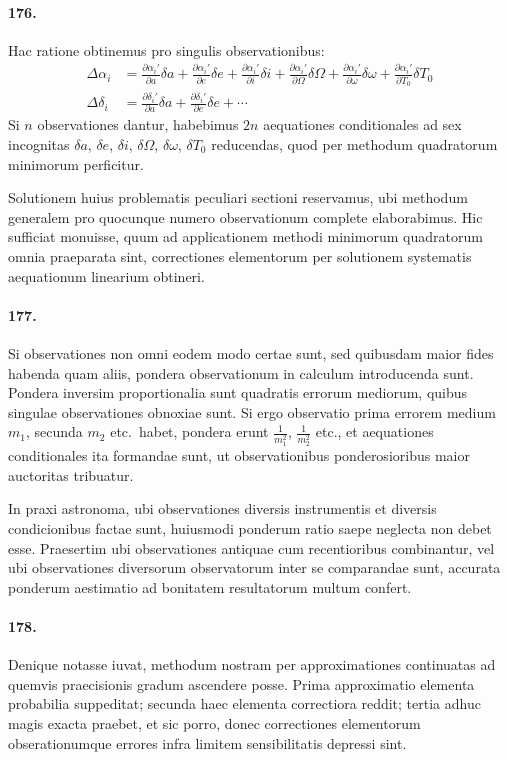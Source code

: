 \documentclass[12pt,a4paper]{article}
\begin{document}
\paragraph{176.}
Hac ratione obtinemus pro singulis observationibus:
\begin{align*}
\Delta\alpha_i &= \frac{\partial\alpha_i'}{\partial a}\delta a + \frac{\partial\alpha_i'}{\partial e}\delta e + \frac{\partial\alpha_i'}{\partial i}\delta i + \frac{\partial\alpha_i'}{\partial\Omega}\delta\Omega + \frac{\partial\alpha_i'}{\partial\omega}\delta\omega + \frac{\partial\alpha_i'}{\partial T_0}\delta T_0\\
\Delta\delta_i &= \frac{\partial\delta_i'}{\partial a}\delta a + \frac{\partial\delta_i'}{\partial e}\delta e + \cdots
\end{align*}
Si $n$ observationes dantur, habebimus $2n$ aequationes conditionales ad sex incognitas $\delta a$, $\delta e$, $\delta i$, $\delta\Omega$, $\delta\omega$, $\delta T_0$ reducendas, quod per methodum quadratorum minimorum perficitur.

Solutionem huius problematis peculiari sectioni reservamus, ubi methodum generalem pro quocunque numero observationum complete elaborabimus. Hic sufficiat monuisse, quum ad applicationem methodi minimorum quadratorum omnia praeparata sint, correctiones elementorum per solutionem systematis aequationum linearium obtineri.

\paragraph{177.}
Si observationes non omni eodem modo certae sunt, sed quibusdam maior fides habenda quam aliis, pondera observationum in calculum introducenda sunt. Pondera inversim proportionalia sunt quadratis errorum mediorum, quibus singulae observationes obnoxiae sunt. Si ergo observatio prima errorem medium $m_1$, secunda $m_2$ etc.~habet, pondera erunt $\frac{1}{m_1^2}$, $\frac{1}{m_2^2}$ etc., et aequationes conditionales ita formandae sunt, ut observationibus ponderosioribus maior auctoritas tribuatur.

In praxi astronoma, ubi observationes diversis instrumentis et diversis condicionibus factae sunt, huiusmodi ponderum ratio saepe neglecta non debet esse. Praesertim ubi observationes antiquae cum recentioribus combinantur, vel ubi observationes diversorum observatorum inter se comparandae sunt, accurata ponderum aestimatio ad bonitatem resultatorum multum confert.

\paragraph{178.}
Denique notasse iuvat, methodum nostram per approximationes continuatas ad quemvis praecisionis gradum ascendere posse. Prima approximatio elementa probabilia suppeditat; secunda haec elementa correctiora reddit; tertia adhuc magis exacta praebet, et sic porro, donec correctiones elementorum obserationumque errores infra limitem sensibilitatis depressi sint.
\end{document}
